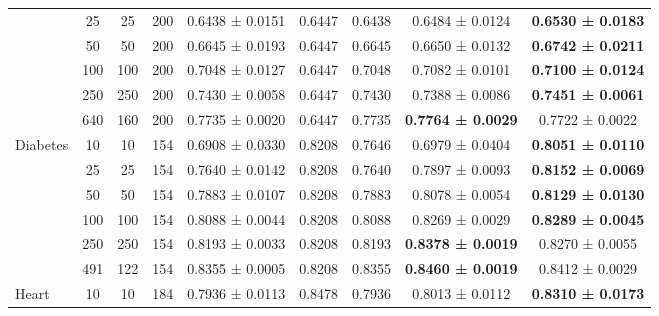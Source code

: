 \begin{table}
{\begin{tabular}[H]{@{}lcccccccc@{}}
                              & 25    & 25   & 200  & 0.6438 ± 0.0151      & 0.6447                & 0.6438          & 0.6484 ± 0.0124          & \textbf{0.6530 ± 0.0183} \\
                              & 50    & 50   & 200  & 0.6645 ± 0.0193      & 0.6447                & 0.6645          & 0.6650 ± 0.0132          & \textbf{0.6742 ± 0.0211} \\
                              & 100   & 100  & 200  & 0.7048 ± 0.0127      & 0.6447                & 0.7048          & 0.7082 ± 0.0101          & \textbf{0.7100 ± 0.0124} \\
                              & 250   & 250  & 200  & 0.7430 ± 0.0058      & 0.6447                & 0.7430          & 0.7388 ± 0.0086          & \textbf{0.7451 ± 0.0061} \\
                              & 640   & 160  & 200  & 0.7735 ± 0.0020      & 0.6447                & 0.7735          & \textbf{0.7764 ± 0.0029} & 0.7722 ± 0.0022          \\
                              \midrule
\multirow{6}{*}{Diabetes}     & 10    & 10   & 154  & 0.6908 ± 0.0330      & 0.8208                & 0.7646          & 0.6979 ± 0.0404          & \textbf{0.8051 ± 0.0110} \\
                              & 25    & 25   & 154  & 0.7640 ± 0.0142      & 0.8208                & 0.7640          & 0.7897 ± 0.0093          & \textbf{0.8152 ± 0.0069} \\
                              & 50    & 50   & 154  & 0.7883 ± 0.0107      & 0.8208                & 0.7883          & 0.8078 ± 0.0054          & \textbf{0.8129 ± 0.0130} \\
                              & 100   & 100  & 154  & 0.8088 ± 0.0044      & 0.8208                & 0.8088          & 0.8269 ± 0.0029          & \textbf{0.8289 ± 0.0045} \\
                              & 250   & 250  & 154  & 0.8193 ± 0.0033      & 0.8208                & 0.8193          & \textbf{0.8378 ± 0.0019} & 0.8270 ± 0.0055          \\
                              & 491   & 122  & 154  & 0.8355 ± 0.0005      & 0.8208                & 0.8355          & \textbf{0.8460 ± 0.0019} & 0.8412 ± 0.0029          \\
                              \midrule
\multirow{6}{*}{Heart}        & 10    & 10   & 184  & 0.7936 ± 0.0113      & 0.8478                & 0.7936          & 0.8013 ± 0.0112          & \textbf{0.8310 ± 0.0173} \\

\end{tabular}}
\end{table}
